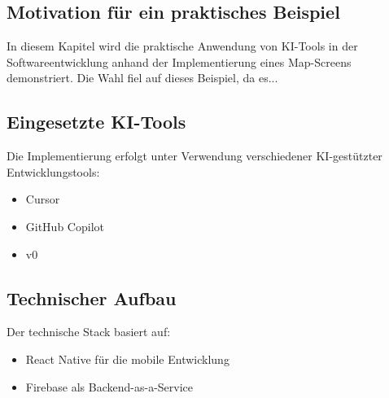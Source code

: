 \subsection{Motivation für ein praktisches Beispiel}
In diesem Kapitel wird die praktische Anwendung von KI-Tools in der Softwareentwicklung anhand der Implementierung eines Map-Screens demonstriert. Die Wahl fiel auf dieses Beispiel, da es...

\subsection{Eingesetzte KI-Tools}
Die Implementierung erfolgt unter Verwendung verschiedener KI-gestützter Entwicklungstools:
\begin{itemize}
    \item Cursor
    \item GitHub Copilot
    \item v0
\end{itemize}

\subsection{Technischer Aufbau}
Der technische Stack basiert auf:
\begin{itemize}
    \item React Native für die mobile Entwicklung
    \item Firebase als Backend-as-a-Service
\end{itemize} 